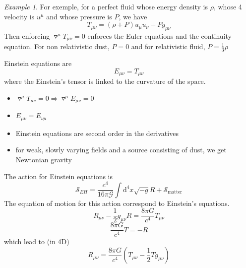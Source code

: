 \documentclass[a4paper]{book}
\theoremstyle{definition}
\theoremstyle{remark}
\newtheorem*{example}{Example}
\begin{document}
\begin{example}
    For exemple, for a perfect fluid whose energy density is $\rho$, whose 4 velocity is $u^\mu$ and whose pressure is $P$, we have 
    \begin{equation}
        T_{\mu\nu} = (\rho + P)u_\mu u_\nu + Pg_{\mu\nu}
    \end{equation}
    Then enforcing $\triangledown^\mu T_{\mu\nu} = 0$ enforces the Euler equations and the continuity equation. For non relativistic dust, $P = 0$ and for relativistic fluid, $P = \frac{1}{3}\rho$
\end{example}

Einstein equations are 
\begin{equation}
    E_{\mu\nu} = T_{\mu\nu}
\end{equation}
where the Einstein's tensor is linked to the curvature of the space. 
\begin{itemize}
    \item $\triangledown^\mu T_{\mu\nu} = 0 \Rightarrow \triangledown^\mu E_{\mu\nu} = 0$
    \item $E_{\mu\nu} = E_{\nu\mu}$
    \item Einstein equations are second order in the derivatives 
    \item for weak, slowly varying fields and a source consisting of dust, we get Newtonian gravity
\end{itemize}
The action for Einstein equations is 
\begin{equation}
    \mathcal{S}_{EH} = \frac{c^4}{16\pi \mathcal{G}}\int \text{d}^4 x \sqrt{-g}R + \mathcal{S}_{\text{matter}}
\end{equation}
The equation of motion for this action correspond to Einstein's equations. 
\begin{equation}
    R_{\mu\nu} - \frac{1}{2}g_{\mu\nu}R = \frac{8\pi G}{c^4}T_{\mu\nu}
\end{equation}
\begin{equation}
    \frac{8\pi G}{c^4}T = -R
\end{equation}
which lead to (in 4D)
\begin{equation}
    R_{\mu\nu} = \frac{8\pi G}{c^4}(T_{\mu\nu} - \frac{1}{2}Tg_{\mu\nu})
\end{equation}
\end{document}
